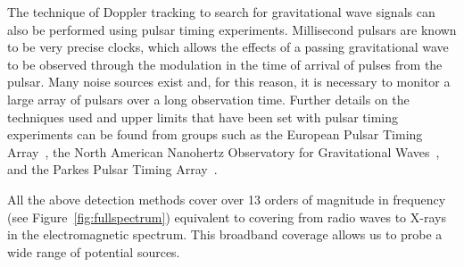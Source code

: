 \documentclass{article}
\begin{document}
The technique of Doppler tracking to search for gravitational wave signals can
also be performed using pulsar timing experiments.  Millisecond pulsars
\cite{Lorimer:2008} are known to be very precise clocks, which allows the
effects of a passing gravitational wave to be observed through the modulation in
the time of arrival of pulses from the pulsar.  Many noise sources exist and,
for this reason, it is necessary to monitor a large array of pulsars over a long
observation time.  Further details on the techniques used and upper limits that
have been set with pulsar timing experiments can be found from groups such as
the European Pulsar Timing Array~\cite{Janssen:2008}, the North American
Nanohertz Observatory for Gravitational Waves~\cite{Jenet:2006,Jenet:2009}, and
the Parkes Pulsar Timing Array~\cite{Hobbs:2008}.

All the above detection methods cover over 13 orders of magnitude in frequency
(see Figure~\ref{fig:fullspectrum}) equivalent to covering from radio waves to
X-rays in the electromagnetic spectrum.  This broadband coverage allows us to
probe a wide range of potential sources. 

\end{document}
